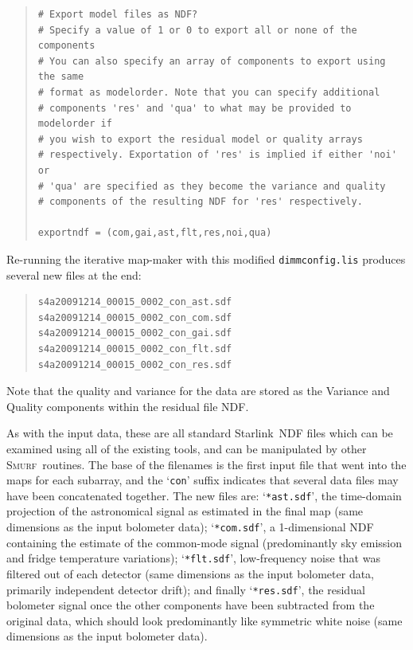 \documentclass[twoside,11pt]{article}
\newcommand{\htmladdnormallink}[2]{#1}
\newcommand{\xref}[3]{#1}
\renewcommand{\_}{\texttt{\symbol{95}}}
\newenvironment{myquote}{\begin{quote}\begin{small}}{\end{small}\end{quote}}
\newcommand{\starlink}{\htmladdnormallink{Starlink}{http://starlink.jach.hawaii.edu}}
\newcommand{\smurf}{\xref{\textsc{Smurf}}{sun258}{}}
\begin{document}
\begin{myquote}
\begin{verbatim}
# Export model files as NDF?
# Specify a value of 1 or 0 to export all or none of the components
# You can also specify an array of components to export using the same
# format as modelorder. Note that you can specify additional
# components 'res' and 'qua' to what may be provided to modelorder if
# you wish to export the residual model or quality arrays
# respectively. Exportation of 'res' is implied if either 'noi' or
# 'qua' are specified as they become the variance and quality
# components of the resulting NDF for 'res' respectively.

exportndf = (com,gai,ast,flt,res,noi,qua)
\end{verbatim}
\end{myquote}

Re-running the iterative map-maker with this modified
\texttt{dimmconfig.lis} produces several new files at the end:

\begin{myquote}
\begin{verbatim}
s4a20091214_00015_0002_con_ast.sdf
s4a20091214_00015_0002_con_com.sdf
s4a20091214_00015_0002_con_gai.sdf
s4a20091214_00015_0002_con_flt.sdf
s4a20091214_00015_0002_con_res.sdf
\end{verbatim}
\end{myquote}

Note that the quality and variance for the data are stored as
the Variance and Quality components within the residual file NDF.

As with the input data, these are all standard \starlink\ NDF files
which can be examined using all of the existing tools, and can be
manipulated by other \smurf\ routines. The base of the filenames is
the first input file that went into the maps for each subarray, and
the `\texttt{con}' suffix indicates that several data files may have
been concatenated together. The new files are: `\texttt{*ast.sdf}',
the time-domain projection of the astronomical signal as estimated in
the final map (same dimensions as the input bolometer data);
`\texttt{*com.sdf}', a 1-dimensional NDF containing the estimate of
the common-mode signal (predominantly sky emission and fridge
temperature variations); `\texttt{*flt.sdf}', low-frequency noise that
was filtered out of each detector (same dimensions as the input
bolometer data, primarily independent detector drift); and finally
`\texttt{*res.sdf}', the residual bolometer signal once the other
components have been subtracted from the original data, which should
look predominantly like symmetric white noise (same dimensions as the
input bolometer data).
\end{document}
